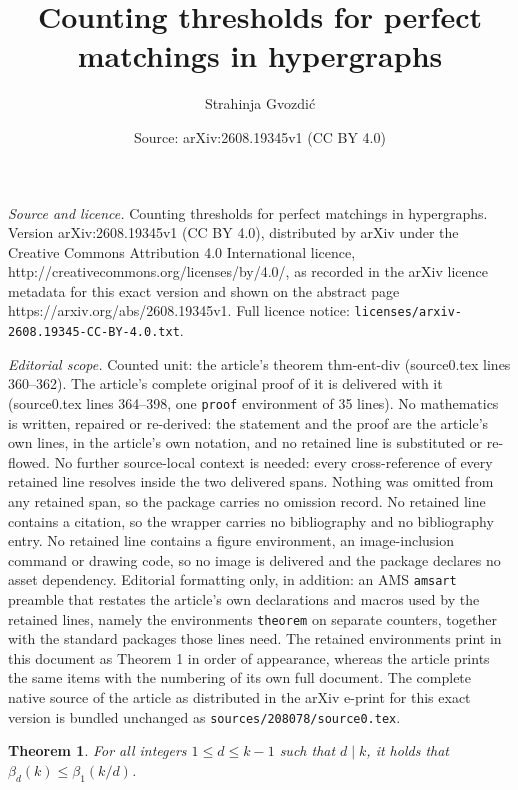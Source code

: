 \documentclass[10pt,a4paper]{amsart}
\title{Counting thresholds for perfect matchings in hypergraphs}
\author{Strahinja Gvozdi\'c}
\date{Source: arXiv:2608.19345v1 (CC BY 4.0)}
\newtheorem{theorem}{Theorem}
\begin{document}
\maketitle

\noindent\emph{Source and licence.} Counting thresholds for perfect matchings in hypergraphs. Version arXiv:2608.19345v1 (CC BY 4.0), distributed by arXiv under the Creative Commons Attribution 4.0 International licence, http://creativecommons.org/licenses/by/4.0/, as recorded in the arXiv licence metadata for this exact version and shown on the abstract page https://arxiv.org/abs/2608.19345v1. Full licence notice: \texttt{licenses/arxiv-2608.19345-CC-BY-4.0.txt}.\par\smallskip

\noindent\textit{Editorial scope.} Counted unit: the article's theorem thm-ent-div (source0.tex lines 360--362). The article's complete original proof of it is delivered with it (source0.tex lines 364--398, one \texttt{proof} environment of 35 lines). No mathematics is written, repaired or re-derived: the statement and the proof are the article's own lines, in the article's own notation, and no retained line is substituted or re-flowed.  No further source-local context is needed: every cross-reference of every retained line resolves inside the two delivered spans.  Nothing was omitted from any retained span, so the package carries no omission record.  No retained line contains a citation, so the wrapper carries no bibliography and no bibliography entry.  No retained line contains a figure environment, an image-inclusion command or drawing code, so no image is delivered and the package declares no asset dependency.  Editorial formatting only, in addition: an AMS \texttt{amsart} preamble that restates the article's own declarations and macros used by the retained lines, namely the environments \texttt{theorem} on separate counters, together with the standard packages those lines need.  The retained environments print in this document as Theorem 1 in order of appearance, whereas the article prints the same items with the numbering of its own full document.  The complete native source of the article as distributed in the arXiv e-print for this exact version is bundled unchanged as \texttt{sources/208078/source0.tex}.
\begin{theorem}\label{thm-ent-div}
    For all integers $1\le d\le k-1$ such that $d\mid k$, it holds that $\beta_d(k)\le \beta_1(k/d)$.
\end{theorem}
\end{document}
